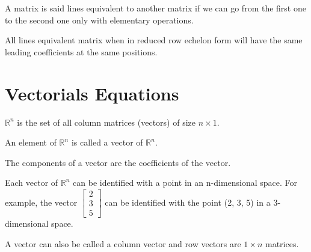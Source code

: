 \begin{definition}
    A matrix is said lines equivalent to another matrix if we can go from the first one to the second one only with elementary operations.
\end{definition}
All lines equivalent matrix when in reduced row echelon form will have the same leading coefficients at the same positions.

\section{Vectorials Equations}

\begin{definition}[$\mathbb{R}^n$]
    $\mathbb{R}^n$ is the set of all column matrices (vectors) of size $n \times 1$.
\end{definition}

\begin{definition}
    An element of $\mathbb{R}^n$ is called a vector of $\mathbb{R}^n$.
\end{definition}

\begin{definition}[Components]
    The components of a vector are the coefficients of the vector.
\end{definition}

\begin{eg}
    Each vector of $\mathbb{R}^n$ can be identified with a point in an n-dimensional space. For example, the vector $\begin{bmatrix} 2 \\ 3 \\ 5 \end{bmatrix}$ can be identified with the point (2, 3, 5) in a 3-dimensional space.
\end{eg}
A vector can also be called a column vector and row vectors are $1 \times n$ matrices.

